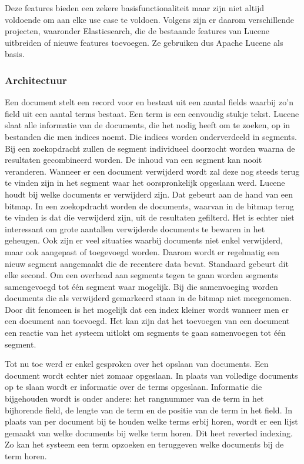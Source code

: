 Deze features bieden een zekere basisfunctionaliteit maar zijn niet altijd voldoende om aan elke use case te voldoen. Volgens \textcite{Whissel2009} zijn er daarom verschillende projecten, waaronder Elasticsearch, die de bestaande features van Lucene uitbreiden of nieuwe features toevoegen. Ze gebruiken dus Apache Lucene als basis.

\subsubsection{Architectuur}

Een document stelt een record voor en bestaat uit een aantal fields waarbij zo’n field uit een aantal terms bestaat. Een term is een eenvoudig stukje tekst. Lucene slaat alle informatie van de documents, die het nodig heeft om te zoeken, op in bestanden die men indices noemt. Die indices worden onderverdeeld in segments. Bij een zoekopdracht zullen de segment individueel doorzocht worden waarna de resultaten gecombineerd worden. De inhoud van een segment kan nooit veranderen. Wanneer er een document verwijderd wordt zal deze nog steeds terug te vinden zijn in het segment waar het oorspronkelijk opgeslaan werd. Lucene houdt bij welke documents er verwijderd zijn. Dat gebeurt aan de hand van een bitmap. In een zoekopdracht worden de documents, waarvan in de bitmap terug te vinden is dat die verwijderd zijn, uit de resultaten gefilterd. Het is echter niet interessant om grote aantallen verwijderde documents te bewaren in het geheugen. Ook zijn er veel situaties waarbij documents niet enkel verwijderd, maar ook aangepast of toegevoegd worden. Daarom wordt er regelmatig een nieuw segment aangemaakt die de recentere data bevat. Standaard gebeurt dit elke second. Om een overhead aan segments tegen te gaan worden segments samengevoegd tot één segment waar mogelijk. Bij die samenvoeging worden documents die als verwijderd gemarkeerd staan in de bitmap niet meegenomen. Door dit fenomeen is het mogelijk dat een index kleiner wordt wanneer men er een document aan toevoegd. Het kan zijn dat het toevoegen van een document een reactie van het systeem uitlokt om segments te gaan samenvoegen tot één segment. \autocite{Brasetvik2017}

Tot nu toe werd er enkel gesproken over het opslaan van documents. Een document wordt echter niet zomaar opgeslaan. In plaats van volledige documents op te slaan wordt er informatie over de terms opgeslaan. Informatie die bijgehouden wordt is onder andere: het rangnummer van de term in het bijhorende field, de lengte van de term en de positie van de term in het field. In plaats van per document bij te houden welke terms erbij horen, wordt er een lijst gemaakt van welke documents bij welke term horen. Dit heet reverted indexing. Zo kan het systeem een term opzoeken en teruggeven welke documents bij de term horen. \autocite{Whissel2009}

